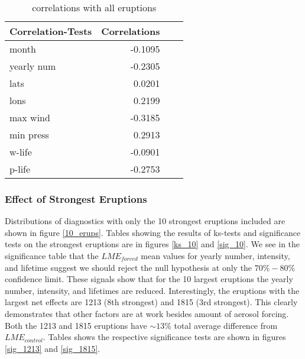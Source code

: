 \begin{table}[!tbp]
\centering
\begin{tabular}{lrrr}
\toprule
             Correlation-Tests &     Correlations \\
\midrule

month & -0.1095 \\
yearly num & -0.2305 \\
lats & 0.0201 \\
lons & 0.2199 \\
max wind & -0.3185 \\
min press & 0.2913 \\
w-life & -0.0901 \\
p-life & -0.2753 \\

\bottomrule
\end{tabular}
\caption{correlations with all eruptions}
\label{corr_all}
\end{table}

\subsubsection{Effect of Strongest Eruptions}
Distributions of diagnostics with only the 10 strongest eruptions included are shown in figure \ref{10_erups}. Tables showing the results of ks-tests and significance tests on the strongest eruptions are in figures \ref{ks_10} and \ref{sig_10}. We see in the significance table that the $LME_{forced}$ mean values for yearly number, intensity, and lifetime suggest we should reject the null hypothesis at only the $70\%-80\%$ confidence limit. These signals show that for the 10 largest eruptions the yearly number, intensity, and lifetimes are reduced. Interestingly, the eruptions with the largest net effects are 1213 (8th strongest) and 1815 (3rd strongest). This clearly demonstrates that other factors are at work besides amount of aerosol forcing. Both the 1213 and 1815 eruptions have ${\sim}13\%$ total average difference from $LME_{control}$. Tables shows the respective significance tests are shown in figures \ref{sig_1213} and \ref{sig_1815}.   


